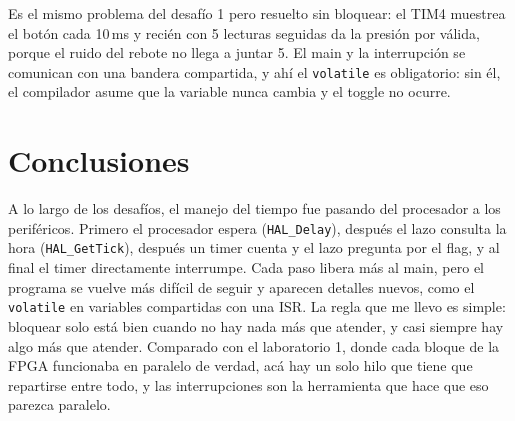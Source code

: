 \documentclass[11pt,a4paper]{article}
\begin{document}
Es el mismo problema del desafío 1 pero resuelto sin bloquear: el TIM4 muestrea el botón cada
10\,ms y recién con 5 lecturas seguidas da la presión por válida, porque el ruido del rebote no
llega a juntar 5. El main y la interrupción se comunican con una bandera compartida, y ahí el
\texttt{volatile} es obligatorio: sin él, el compilador asume que la variable nunca cambia y el
toggle no ocurre.

\section*{Conclusiones}

A lo largo de los desafíos, el manejo del tiempo fue pasando del procesador a los periféricos.
Primero el procesador espera (\texttt{HAL\_Delay}), después el lazo consulta la hora
(\texttt{HAL\_GetTick}), después un timer cuenta y el lazo pregunta por el flag, y al final el
timer directamente interrumpe. Cada paso libera más al main, pero el programa se vuelve más
difícil de seguir y aparecen detalles nuevos, como el \texttt{volatile} en variables compartidas
con una ISR. La regla que me llevo es simple: bloquear solo está bien cuando no hay nada más que
atender, y casi siempre hay algo más que atender. Comparado con el laboratorio 1, donde cada
bloque de la FPGA funcionaba en paralelo de verdad, acá hay un solo hilo que tiene que repartirse
entre todo, y las interrupciones son la herramienta que hace que eso parezca paralelo.
\end{document}
